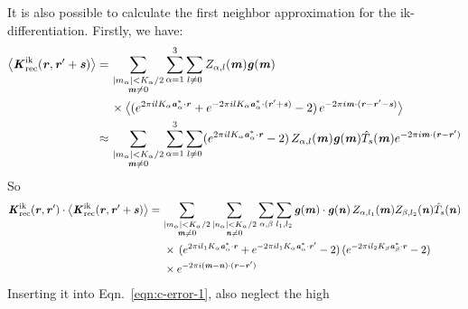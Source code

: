 \documentclass[aps,pre,preprint,unsortedaddress]{revtex4}
\renewcommand{\v}[1]{\textbf{\textit{#1}}}
\begin{document}
It is also possible to calculate the first neighbor approximation for the
ik-differentiation. Firstly, we have:
\begin{align}\nonumber
  \big\langle
  \v K^{\textrm{ik}}_{\textrm{rec}}(\v r, \v r'+\v s)
  \big\rangle
  = \,&
  \sum_{
    \begin{subarray}{c}
      \vert m_{\alpha}\vert < K_\alpha/2\\
      \v m\neq 0
    \end{subarray}}
  \sum_{\alpha=1}^3\sum_{l\neq 0}
  Z_{\alpha,l}(\v m)
  \v g(\v m) \\ \nonumber
  \,&
  \times
  \big\langle
  (
  e^{2\pi i l K_\alpha\v a^\ast_\alpha\cdot \v r} +
  e^{-2\pi i l K_\alpha\v a^\ast_\alpha\cdot (\v r' + \v s)}
  - 2
  )\,
  e^{-2\pi i\v m\cdot(\v r-\v r' -\v s)}
  \big\rangle \\
  \approx\,&
  \sum_{
    \begin{subarray}{c}
      \vert m_{\alpha}\vert < K_\alpha/2\\
      \v m\neq 0
    \end{subarray}}
  \sum_{\alpha=1}^3\sum_{l\neq 0}
  (
  e^{2\pi i l K_\alpha\v a^\ast_\alpha\cdot \v r} 
  - 2
  )\,
  Z_{\alpha,l}(\v m)
  \v g(\v m)
  \hat T_s(\v m)
  e^{-2\pi i\v m\cdot(\v r-\v r')}  
\end{align}
So
\begin{align}\nonumber
  \v K^{\textrm{ik}}_{\textrm{rec}}(\v r,\v r')\cdot
  \big\langle
  \v K^{\textrm{ik}}_{\textrm{rec}}(\v r, \v r'+\v s)
  \big\rangle
  =\,&
  \sum_{
    \begin{subarray}{c}
      \vert m_{\alpha}\vert < K_\alpha/2\\
      \v m\neq 0
    \end{subarray}}
  \sum_{
    \begin{subarray}{c}
      \vert n_{\alpha}\vert < K_\alpha/2\\
      \v n\neq 0
    \end{subarray}}
  \sum_{\alpha,\beta}
  \sum_{l_1,l_2}
  \v g(\v m)\cdot\v g(\v n)\,
  Z_{\alpha,l_1}(\v m)Z_{\beta,l_2}(\v n)\hat T_s(\v n)
  \\\nonumber
  &\,
  \times
  \,(
  e^{2\pi i l_1 K_\alpha\v a^\ast_\alpha\cdot \v r} +
  e^{-2\pi i l_1 K_\alpha\v a^\ast_\alpha\cdot \v r'}
  - 2
  )
  \,(
  e^{-2\pi i l_2 K_\beta\v a^\ast_\beta\cdot \v r}
  - 2
  )\\
  &\,
  \times
  e^{-2\pi i(\v m-\v n)\cdot(\v r-\v r')}
\end{align}
Inserting it into Eqn.~\eqref{eqn:c-error-1}, also neglect the high
\end{document}
